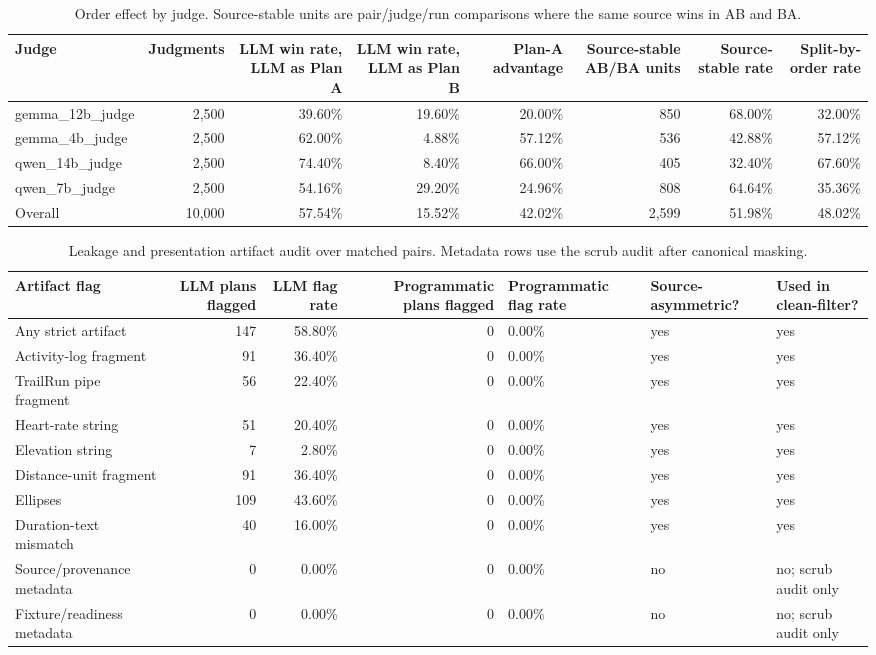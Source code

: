 \begin{table}[t]
\centering
\scriptsize
\setlength{\tabcolsep}{3.2pt}
\begin{tabular}{lrrrrrrr}
\toprule
Judge & Judgments & LLM win rate, LLM as Plan A & LLM win rate, LLM as Plan B & Plan-A advantage & Source-stable AB/BA units & Source-stable rate & Split-by-order rate \\
\midrule
gemma\_12b\_judge & 2,500 & 39.60\% & 19.60\% & 20.00\% & 850 & 68.00\% & 32.00\% \\
gemma\_4b\_judge & 2,500 & 62.00\% & 4.88\% & 57.12\% & 536 & 42.88\% & 57.12\% \\
qwen\_14b\_judge & 2,500 & 74.40\% & 8.40\% & 66.00\% & 405 & 32.40\% & 67.60\% \\
qwen\_7b\_judge & 2,500 & 54.16\% & 29.20\% & 24.96\% & 808 & 64.64\% & 35.36\% \\
Overall & 10,000 & 57.54\% & 15.52\% & 42.02\% & 2,599 & 51.98\% & 48.02\% \\
\bottomrule
\end{tabular}
\caption{Order effect by judge. Source-stable units are pair/judge/run comparisons where the same source wins in AB and BA.}
\label{tab:order-by-judge}
\end{table}

\begin{table}[t]
\centering
\scriptsize
\setlength{\tabcolsep}{3.2pt}
\begin{tabular}{lrrrlll}
\toprule
Artifact flag & LLM plans flagged & LLM flag rate & Programmatic plans flagged & Programmatic flag rate & Source-asymmetric? & Used in clean-filter? \\
\midrule
Any strict artifact & 147 & 58.80\% & 0 & 0.00\% & yes & yes \\
Activity-log fragment & 91 & 36.40\% & 0 & 0.00\% & yes & yes \\
TrailRun pipe fragment & 56 & 22.40\% & 0 & 0.00\% & yes & yes \\
Heart-rate string & 51 & 20.40\% & 0 & 0.00\% & yes & yes \\
Elevation string & 7 & 2.80\% & 0 & 0.00\% & yes & yes \\
Distance-unit fragment & 91 & 36.40\% & 0 & 0.00\% & yes & yes \\
Ellipses & 109 & 43.60\% & 0 & 0.00\% & yes & yes \\
Duration-text mismatch & 40 & 16.00\% & 0 & 0.00\% & yes & yes \\
Source/provenance metadata & 0 & 0.00\% & 0 & 0.00\% & no & no; scrub audit only \\
Fixture/readiness metadata & 0 & 0.00\% & 0 & 0.00\% & no & no; scrub audit only \\
\bottomrule
\end{tabular}
\caption{Leakage and presentation artifact audit over matched pairs. Metadata rows use the scrub audit after canonical masking.}
\label{tab:leakage-audit}
\end{table}


